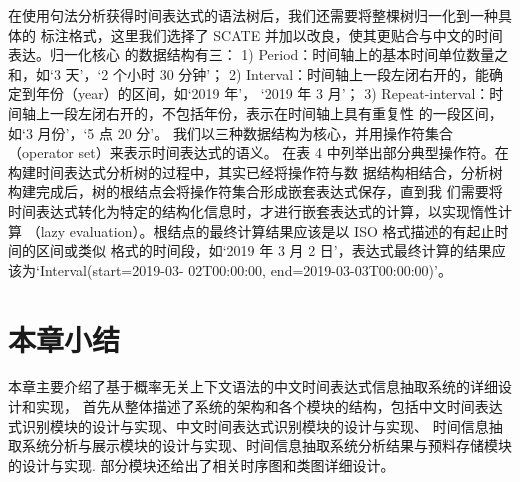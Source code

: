 在使用句法分析获得时间表达式的语法树后，我们还需要将整棵树归一化到一种具体的
标注格式，这里我们选择了 SCATE 并加以改良，使其更贴合与中文的时间表达。归一化核心
的数据结构有三：
1) Period：时间轴上的基本时间单位数量之和，如‘3 天’，‘2 个小时 30 分钟’；
2) Interval：时间轴上一段左闭右开的，能确定到年份（year）的区间，如‘2019 年’，
‘2019 年 3 月’；
3) Repeat-interval：时间轴上一段左闭右开的，不包括年份，表示在时间轴上具有重复性
的一段区间，如‘3 月份’，‘5 点 20 分’。
我们以三种数据结构为核心，并用操作符集合（operator set）来表示时间表达式的语义。
在表 4 中列举出部分典型操作符。在构建时间表达式分析树的过程中，其实已经将操作符与数
据结构相结合，分析树构建完成后，树的根结点会将操作符集合形成嵌套表达式保存，直到我
们需要将时间表达式转化为特定的结构化信息时，才进行嵌套表达式的计算，以实现惰性计算
（lazy evaluation）。根结点的最终计算结果应该是以 ISO 格式描述的有起止时间的区间或类似
格式的时间段，如‘2019 年 3 月 2 日’，表达式最终计算的结果应该为‘Interval(start=2019-03-
02T00:00:00, end=2019-03-03T00:00:00)’。


\section{本章小结}

本章主要介绍了基于概率无关上下文语法的中文时间表达式信息抽取系统的详细设计和实现，
首先从整体描述了系统的架构和各个模块的结构，包括中文时间表达式识别模块的设计与实现、中文时间表达式识别模块的设计与实现、
时间信息抽取系统分析与展示模块的设计与实现、时间信息抽取系统分析结果与预料存储模块的设计与实现.
部分模块还给出了相关时序图和类图详细设计。
